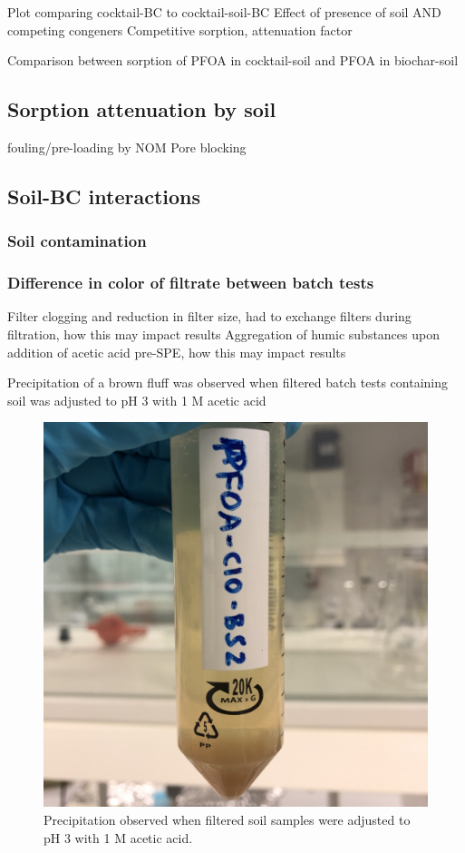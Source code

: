Plot comparing cocktail-BC to cocktail-soil-BC
Effect of presence of soil AND competing congeners
Competitive sorption, attenuation factor

Comparison between sorption of PFOA in cocktail-soil and PFOA in biochar-soil

\subsection{Sorption attenuation by soil}
fouling/pre-loading by NOM
Pore blocking

\subsection{Soil-BC interactions}

\subsubsection{Soil contamination}

\subsubsection{Difference in color of filtrate between batch tests}
Filter clogging and reduction in filter size, had to exchange filters during filtration, how this may impact results
Aggregation of humic substances upon addition of acetic acid pre-SPE, how this may impact results

Precipitation of a brown fluff was observed when filtered batch tests containing soil was adjusted to pH 3 with 1 M acetic acid

\begin{figure}
    \centering
    \includegraphics[width=0.6\linewidth,scale=0.6]{Bilder/Samples/Precipitation.jpg}
    \caption{Precipitation observed when filtered soil samples were adjusted to pH 3 with 1 M acetic acid.}
    \label{fig:precip}
\end{figure}

